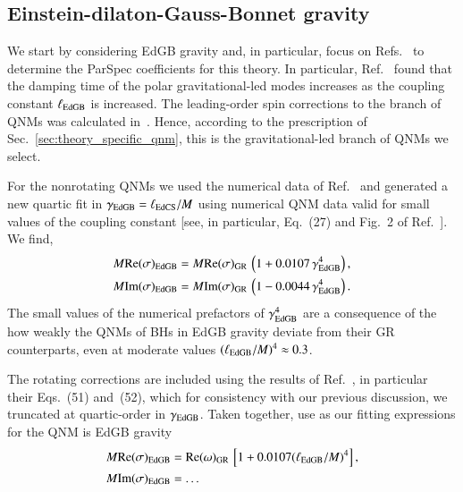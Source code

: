 \documentclass[twocolumn,
               prd,
               aps,
               superscriptaddress,
               tightenlines,
               nofootinbib,
               eqsecnum,
               amsfonts,
               amsmath,
               longbibliography]{revtex4-1}
\begin{document}
\subsection{Einstein-dilaton-Gauss-Bonnet gravity}
\label{app:map_edgb}

We start by considering EdGB gravity and, in particular, focus on
Refs.~\cite{Blazquez-Salcedo:2016enn,Pierini:2021jxd} to determine the
ParSpec coefficients for this theory.
%
In particular, Ref.~\cite{Blazquez-Salcedo:2016enn} found that the damping time
of the polar gravitational-led modes increases as the coupling constant
$\ell_{\rm EdGB}$ is increased. The leading-order spin corrections to the
branch of QNMs was calculated in~\cite{Pierini:2021jxd}.
%
Hence, according to the prescription of Sec.~\ref{sec:theory_specific_qnm},
this is the gravitational-led branch of QNMs we select.

For the nonrotating QNMs we used the numerical data of Ref.~\cite{Blazquez-Salcedo:2016enn} and
generated a new quartic fit in $\gamma_{\rm EdGB} = \ell_{\rm EdCS} / M$ using numerical QNM data valid for small
values of the coupling constant [see, in particular, Eq.~(27) and Fig.~2 of Ref.~\cite{Blazquez-Salcedo:2016enn}].
%
We find,
%
\begin{subequations}
\begin{align}
    M {\rm Re}(\sigma)_{\rm EdGB} &= M {\rm Re}(\sigma)_{\rm GR} \, \left( 1 + 0.0107 \, \gamma_{\rm EdGB}^4 \right),
    \\
    M {\rm Im}(\sigma)_{\rm EdGB} &= M {\rm Im}(\sigma)_{\rm GR} \, \left( 1 - 0.0044 \, \gamma_{\rm EdGB}^4 \right).
\end{align}
\end{subequations}
%
The small values of the numerical prefactors of $\gamma_{\rm EdGB}^4$ are a consequence of the how weakly the QNMs
of BHs in EdGB gravity deviate from their GR counterparts, even at moderate values $(\ell_{\rm EdGB} / M)^4 \approx 0.3$.

The rotating corrections are included using the results of Ref.~\cite{Pierini:2021jxd}, in particular their Eqs.~(51) and~(52),
which for consistency with our previous discussion, we truncated at quartic-order in $\gamma_{\rm EdGB}$.
%
Taken together, use as our fitting expressions for the QNM is EdGB gravity
%
\begin{subequations}
\begin{align}
    M {\rm Re}(\sigma)_{\rm EdGB} &= {\rm Re}(\omega)_{\rm GR} \, \left[ 1 + 0.0107 (\ell_{\rm EdGB} / M)^4 \right],
    \\
    M {\rm Im}(\sigma)_{\rm EdGB} &= \dots %
\end{align}
\end{subequations}
\end{document}
